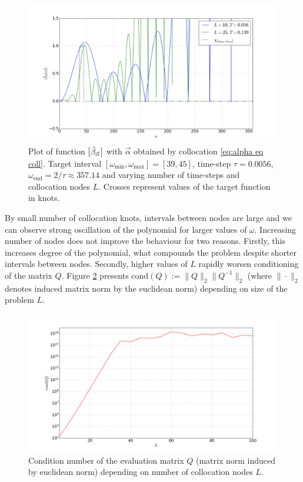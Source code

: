 \documentclass[a4paper,11pt,bibliography=totoc,listof=totoc,headinclude=true,cleardoublepage=empty,oneside]{scrbook}
\newcommand{\dffv}{\Tilde{\beta}_{\Vec{\alpha}}}
\newcommand{\e}{\mathrm{end}}
\begin{document}
\begin{figure}
    \centering
    \includegraphics[width=0.75\linewidth]{latex//images//equi_coll/Figure_1.png}
    \caption{Plot of function $\left|\dffv\right|$ with $\Vec{\alpha}$ obtained by collocation \eqref{eq:alpha eq coll}. Target interval $\left[\omega_{\min}, \omega_{\max} \right] = [39, 45]$, time-step $\tau = 0.0056$, $\omega_\e = 2/\tau \approx 357.14$ and varying number of time-steps and collocation nodes $L$. Crosses represent values of the target function in knots. }
    \label{fig:eq coll beta}
\end{figure}

By small number of collocation knots, intervals between nodes are large and we can observe strong oscillation of the polynomial for larger values of $\omega$. Increasing number of nodes does not improve the behaviour for two reasons. Firstly, this increases degree of the polynomial, what compounds the problem despite shorter intervals between nodes. Secondly, higher values of $L$ rapidly worsen conditioning of the matrix $Q$. Figure \ref{fig:eq coll cond} presents $\mathrm{cond}(Q) := \|Q\|_2 \|Q^{-1}\|_2$ (where $\| \cdot \|_2$ denotes induced matrix norm by the euclidean norm) depending on size of the problem $L$.

\begin{figure}
    \centering
    \includegraphics[width=0.75\linewidth]{latex//images//equi_coll/Figure_2.png}
    \caption{Condition number of the evaluation matrix $Q$ (matrix norm induced by euclidean norm) depending on number of collocation nodes $L$.}
    \label{fig:eq coll cond}
\end{figure}


 
%

\end{document}
